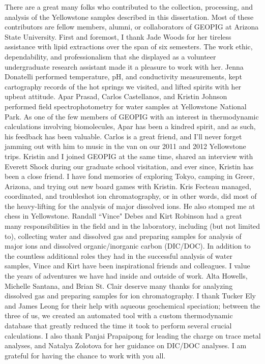 There are a great many folks who contributed to the collection, processing, and analysis of the Yellowstone samples described in this dissertation. Most of these contributors are fellow members, alumni, or collaborators of GEOPIG at Arizona State University. First and foremost, I thank Jade Woods for her tireless assistance with lipid extractions over the span of six semesters. The work ethic, dependability, and professionalism that she displayed as a volunteer undergraduate research assistant made it a pleasure to work with her. Jenna Donatelli performed temperature, pH, and conductivity measurements, kept cartography records of the hot springs we visited, and lifted spirits with her upbeat attitude. Apar Prasad, Carlos Castellanos, and Kristin Johnson performed field spectrophotometry for water samples at Yellowstone National Park. As one of the few members of GEOPIG with an interest in thermodynamic calculations involving biomolecules, Apar has been a kindred spirit, and as such, his feedback has been valuable. Carlos is a great friend, and I'll never forget jamming out with him to music in the van on our 2011 and 2012 Yellowstone trips. Kristin and I joined GEOPIG at the same time, shared an interview with Everett Shock during our graduate school visitation, and ever since, Kristin has been a close friend. I have fond memories of exploring Tokyo, camping in Greer, Arizona, and trying out new board games with Kristin. Kris Fecteau managed, coordinated, and troubleshot ion chromatography, or in other words, did most of the heavy-lifting for the analysis of major dissolved ions. He also stomped me at chess in Yellowstone. Randall ``Vince" Debes and Kirt Robinson had a great many responsibilities in the field and in the laboratory, including (but not limited to), collecting water and dissolved gas and preparing samples for analysis of major ions and dissolved organic/inorganic carbon (DIC/DOC). In addition to the countless additional roles they had in the successful analysis of water samples, Vince and Kirt have been inspirational friends and colleagues. I value the years of adventures we have had inside and outside of work. Alta Howells, Michelle Santana, and Brian St. Clair deserve many thanks for analyzing dissolved gas and preparing samples for ion chromatography. I thank Tucker Ely and James Leong for their help with aqueous geochemical speciation; between the three of us, we created an automated tool with a custom thermodynamic database that greatly reduced the time it took to perform several crucial calculations. I also thank Panjai Prapaipong for leading the charge on trace metal analyses, and Natalya Zolotova for her guidance on DIC/DOC analyses. I am grateful for having the chance to work with you all.

